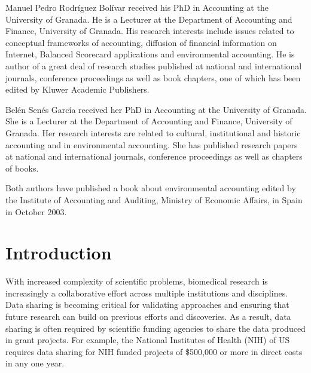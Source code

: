 \documentclass{singlecol-new}
\theoremstyle{TH}{
\newtheorem{lemma}{Lemma}
\newtheorem{theorem}[lemma]{Theorem}
\newtheorem{corrolary}[lemma]{Corrolary}
\newtheorem{conjecture}[lemma]{Conjecture}
\newtheorem{proposition}[lemma]{Proposition}
\newtheorem{claim}[lemma]{Claim}
\newtheorem{stheorem}[lemma]{Wrong Theorem}
\newtheorem{algorithm}{Algorithm}
}
\theoremstyle{THrm}{
\newtheorem{definition}{Definition}[section]
\newtheorem{question}{Question}[section]
\newtheorem{remark}{Remark}
\newtheorem{scheme}{Scheme}
}
\theoremstyle{THhit}{
\newtheorem{case}{Case}[section]
}
\begin{document}
\begin{bio}
Manuel Pedro Rodr\'iguez Bol\'ivar received his PhD in Accounting at
the University of Granada. He is a Lecturer at the Department of
Accounting and Finance, University of Granada. His research
interests include issues related to conceptual frameworks of
accounting, diffusion of financial information on Internet, Balanced
Scorecard applications and environmental accounting. He is author of
a great deal of research studies published at national and
international journals, conference proceedings as well as book
chapters, one of which has been edited by Kluwer Academic
Publishers.

\noindent Bel\'en Sen\'es Garc\'ia received her PhD in Accounting at
the University of Granada. She is a Lecturer at the Department of
Accounting and Finance, University of Granada. Her research
interests are related to cultural, institutional and historic
accounting and in environmental accounting. She has published
research papers at national and international journals, conference
proceedings as well as chapters of books.

\noindent Both authors have published a book about environmental
accounting edited by the Institute of Accounting and Auditing,
Ministry of Economic Affairs, in Spain in October 2003.
\end{bio}


\maketitle


 \section{Introduction}

With increased complexity of scientific problems, biomedical
research is increasingly a collaborative effort across multiple
institutions and disciplines.  Data sharing is becoming critical for
validating approaches and ensuring that future research can build on
previous efforts and discoveries. As a result, data sharing is often
required by scientific funding agencies to share the data produced
in grant projects. For example,  the National Institutes of Health
(NIH) of US requires data sharing for NIH funded projects of
\$500,000 or more in direct costs in any one year.
\end{document}

